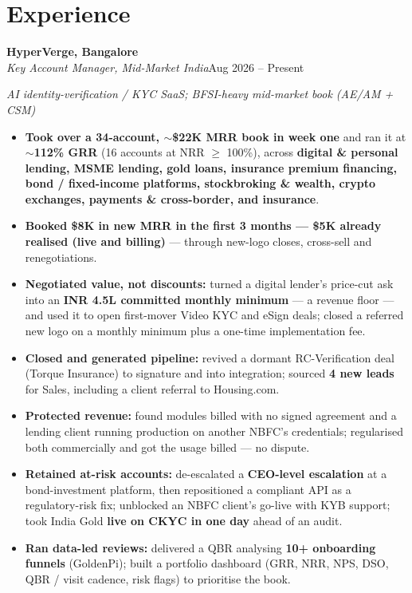 \documentclass[10pt,a4paper]{article}
\begin{document}
\section*{Experience}
\vspace{1pt}\textbf{HyperVerge, Bangalore}\\
\textit{Key Account Manager, Mid-Market India}\hfill Aug 2026 -- Present\par\vspace{1pt}
{\small\itshape AI identity-verification / KYC SaaS; BFSI-heavy mid-market book (AE/AM + CSM)}\par\vspace{1pt}
\begin{itemize}
\item \textbf{Took over a 34-account, $\sim$\$22K MRR book in week one} and ran it at \textbf{$\sim$112\% GRR} (16 accounts at NRR $\geq$ 100\%), across \textbf{digital \& personal lending, MSME lending, gold loans, insurance premium financing, bond / fixed-income platforms, stockbroking \& wealth, crypto exchanges, payments \& cross-border, and insurance}.
\item \textbf{Booked \$8K in new MRR in the first 3 months --- \$5K already realised (live and billing)} --- through new-logo closes, cross-sell and renegotiations.
\item \textbf{Negotiated value, not discounts:} turned a digital lender's price-cut ask into an \textbf{INR 4.5L committed monthly minimum} --- a revenue floor --- and used it to open first-mover Video KYC and eSign deals; closed a referred new logo on a monthly minimum plus a one-time implementation fee.
\item \textbf{Closed and generated pipeline:} revived a dormant RC-Verification deal (Torque Insurance) to signature and into integration; sourced \textbf{4 new leads} for Sales, including a client referral to Housing.com.
\item \textbf{Protected revenue:} found modules billed with no signed agreement and a lending client running production on another NBFC's credentials; regularised both commercially and got the usage billed --- no dispute.
\item \textbf{Retained at-risk accounts:} de-escalated a \textbf{CEO-level escalation} at a bond-investment platform, then repositioned a compliant API as a regulatory-risk fix; unblocked an NBFC client's go-live with KYB support; took India Gold \textbf{live on CKYC in one day} ahead of an audit.
\item \textbf{Ran data-led reviews:} delivered a QBR analysing \textbf{10+ onboarding funnels} (GoldenPi); built a portfolio dashboard (GRR, NRR, NPS, DSO, QBR / visit cadence, risk flags) to prioritise the book.
\end{itemize}
\end{document}
